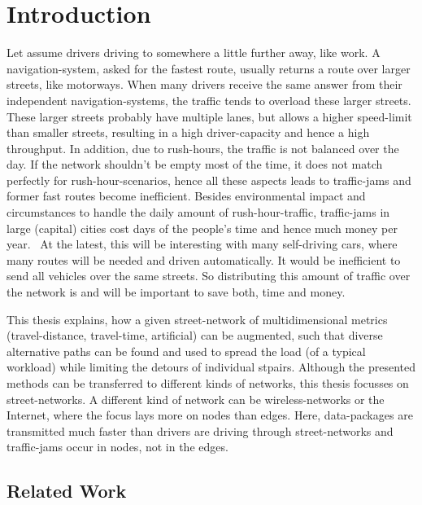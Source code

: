 \chapter{Introduction}
\label{chap:introduction}


Let assume drivers driving to somewhere a little further away, like work.
A navigation-system, asked for the fastest route, usually returns a route over larger streets, like motorways.
When many drivers receive the same answer from their independent navigation-systems, the traffic tends to overload these larger streets.
These larger streets probably have multiple lanes, but allows a higher speed-limit than smaller streets, resulting in a high driver-capacity and hence a high throughput.
In addition, due to rush-hours, the traffic is not balanced over the day.
If the network shouldn't be empty most of the time, it does not match perfectly for rush-hour-scenarios, hence all these aspects leads to traffic-jams and former fast routes become inefficient.
Besides environmental impact and circumstances to handle the daily amount of rush-hour-traffic, traffic-jams in large (capital) cities cost days of the people's time and hence much money per year.~\cite{inrix:traffic-cost}
At the latest, this will be interesting with many self-driving cars, where many routes will be needed and driven automatically.
It would be inefficient to send all vehicles over the same streets.
So distributing this amount of traffic over the network is and will be important to save both, time and money.

This thesis explains, how a given street-network of multidimensional \glspl{metric} (travel-distance, travel-time, artificial) can be augmented, such that diverse alternative paths can be found and used to spread the load (of a typical workload) while limiting the detours of individual \glspl{stpair}.
Although the presented methods can be transferred to different kinds of networks, this thesis focusses on street-networks.
A different kind of network can be wireless-networks or the Internet, where the focus lays more on nodes than edges.
Here, data-packages are transmitted much faster than drivers are driving through street-networks and traffic-jams occur in nodes, not in the edges.

\section{Related Work}

